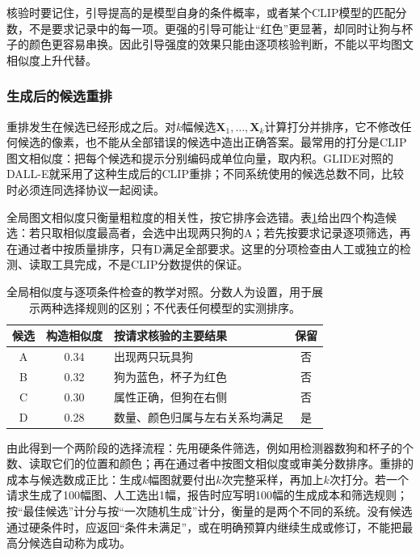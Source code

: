 核验时要记住，引导提高的是模型自身的条件概率，或者某个CLIP模型的匹配分数，不是要求记录中的每一项。更强的引导可能让“红色”更显著，却同时让狗与杯子的颜色更容易串换。因此引导强度的效果只能由逐项核验判断，不能以平均图文相似度上升代替。

\subsubsection{生成后的候选重排}
\label{sec:vision-generation-reranking}

重排发生在候选已经形成之后。对$k$幅候选$\bm{X}_1,\ldots,\bm{X}_k$计算打分并排序，它不修改任何候选的像素，也不能从全部错误的候选中造出正确答案。最常用的打分是CLIP图文相似度：把每个候选和提示分别编码成单位向量，取内积。GLIDE对照的DALL-E就采用了这种生成后的CLIP重排；不同系统使用的候选总数不同，比较时必须连同选择协议一起阅读。

全局图文相似度只衡量粗粒度的相关性，按它排序会选错。表\ref{tab:vision-generation-candidates}给出四个构造候选：若只取相似度最高者，会选中出现两只狗的A；若先按要求记录逐项筛选，再在通过者中按质量排序，只有D满足全部要求。这里的分项检查由人工或独立的检测、读取工具完成，不是CLIP分数提供的保证。

\begin{table}[htbp]
 \centering
 \small
 \begin{tabularx}{\linewidth}{@{}c c X c@{}}
  \toprule
  候选 & 构造相似度 & 按请求核验的主要结果 & 保留\\
  \midrule
  A & 0.34 & 出现两只玩具狗 & 否\\
  B & 0.32 & 狗为蓝色，杯子为红色 & 否\\
  C & 0.30 & 属性正确，但狗在右侧 & 否\\
  D & 0.28 & 数量、颜色归属与左右关系均满足 & 是\\
  \bottomrule
 \end{tabularx}
 \caption{全局相似度与逐项条件检查的教学对照。分数人为设置，用于展示两种选择规则的区别；不代表任何模型的实测排序。}
 \label{tab:vision-generation-candidates}
\end{table}

由此得到一个两阶段的选择流程：先用硬条件筛选，例如用检测器数狗和杯子的个数、读取它们的位置和颜色；再在通过者中按图文相似度或审美分数排序。重排的成本与候选数成正比：生成$k$幅图就要付出$k$次完整采样，再加上$k$次打分。若一个请求生成了100幅图、人工选出1幅，报告时应写明100幅的生成成本和筛选规则；按“最佳候选”计分与按“一次随机生成”计分，衡量的是两个不同的系统。没有候选通过硬条件时，应返回“条件未满足”，或在明确预算内继续生成或修订，不能把最高分候选自动称为成功。

